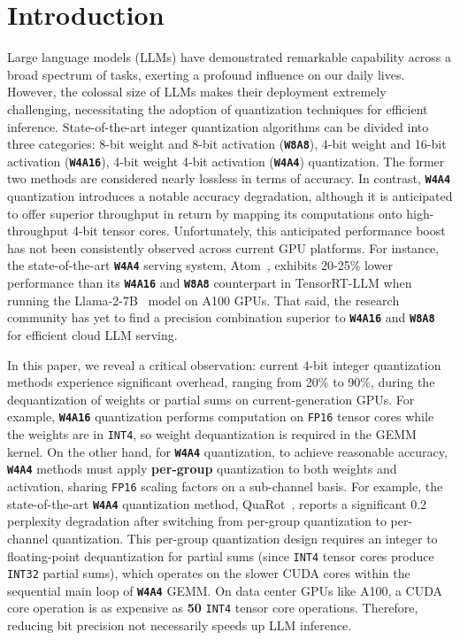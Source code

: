 
\section{Introduction}
\label{sect:intro}



Large language models (LLMs) have demonstrated remarkable capability across a broad spectrum of tasks, exerting a profound influence on our daily lives. 
However, the colossal size of LLMs makes their deployment extremely challenging, necessitating the adoption of quantization techniques for efficient inference. State-of-the-art integer quantization algorithms can be divided into three categories: 8-bit weight and 8-bit activation (\textbf{\texttt{W8A8}}), 4-bit weight and 16-bit activation (\textbf{\texttt{W4A16}}), 4-bit weight 4-bit activation (\textbf{\texttt{W4A4}}) quantization. The former two methods are considered nearly lossless in terms of accuracy. In contrast, \textbf{\texttt{W4A4}} quantization introduces a notable accuracy degradation, although it is anticipated to offer superior throughput in return by mapping its computations onto high-throughput 4-bit tensor cores. Unfortunately, this anticipated performance boost has not been consistently observed across current GPU platforms. %
For instance, the state-of-the-art \textbf{\texttt{W4A4}} serving system, Atom~\cite{zhao2023atom}, exhibits 20-25\% lower performance than its \textbf{\texttt{W4A16}} and \textbf{\texttt{W8A8}} counterpart in TensorRT-LLM when running the Llama-2-7B~\cite{touvron2023llama2} model on A100 GPUs. That said, the research community has yet to find a precision combination superior to \textbf{\texttt{W4A16}} and \textbf{\texttt{W8A8}} for efficient cloud LLM serving. 



In this paper, we reveal a critical observation: current 4-bit integer quantization methods experience significant overhead, ranging from 20\% to 90\%, during the dequantization of weights or partial sums %
on current-generation GPUs. For example, \textbf{\texttt{W4A16}} quantization performs computation on \texttt{FP16} tensor cores while the weights are in \texttt{INT4}, so weight dequantization is required in the GEMM kernel. On the other hand, for \textbf{\texttt{W4A4}} quantization, to achieve reasonable accuracy, \textbf{\texttt{W4A4}} methods must apply \textbf{per-group} quantization to both weights and activation, sharing \texttt{FP16} scaling factors on a sub-channel basis. For example, the state-of-the-art \textbf{\texttt{W4A4}} quantization method, QuaRot~\cite{ashkboos2024quarot}, reports a significant 0.2 perplexity degradation after switching from per-group quantization to per-channel quantization. This per-group quantization design requires an integer to floating-point dequantization for partial sums (since \texttt{INT4} tensor cores produce \texttt{INT32} partial sums), which operates on the slower CUDA cores within the sequential main loop of \textbf{\texttt{W4A4}} GEMM. On data center GPUs like A100, a CUDA core operation is as expensive as \textbf{50} \texttt{INT4} tensor core operations. Therefore, reducing bit precision not necessarily speeds up LLM inference. 


